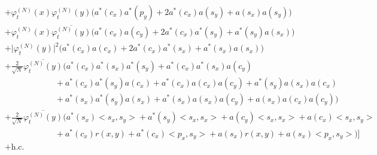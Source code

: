 \documentclass[11pt,a4paper]{scrartcl}
\newcommand{\hc}{\mbox{h.c.}}		%
\newcommand{\scal}[2]{\big<#1,#2\big>} %
\newcommand{\cc}[1]{\overline{#1}}	%
\newcommand{\ph}{\varphi_t^{(N)}}	%
\begin{document}
\begin{align}
& + \ph(x)\ph(y) \Big( a^*(c_x) a^*(p_y) + 2 a^*(c_x) a(s_y) +a(s_x) a(s_y) \Big) \label{l18}\\
& + \ph(x) \cc{\ph(y)} \Big( a^*(c_x) a(c_y) + 2 a^*(c_x) a^*(s_y) + a^*(s_y) a(s_x) \Big) \label{l19}\\
& + \lvert \ph(y) \rvert^2 \Big( a^*(c_x) a(c_x) + 2 a^*(c_x) a^*(s_x) + a^*(s_x) a(s_x) \Big) \label{l20}\\
& + \frac{2}{\sqrt{N}}\cc{\ph(y)} \bigg(    a^*(c_x) a^*(s_x) a^*(s_y) + a^*(c_x) a^*(s_x) a(c_y) \label{l21}\\
					    & \qquad\qquad\qquad + a^*(c_x) a^*(s_y) a(c_x) + a^*(c_x) a(c_x) a(c_y) + a^*(s_y) a(s_x) a(c_x) \label{l22}\\
					    & \qquad\qquad\qquad + a^*(s_x) a^*(s_y) a(s_x) + a^*(s_x) a(s_x) a(c_y) + a(s_x) a(c_x) a(c_y)  \bigg) \label{l23}\\
& + \frac{2}{\sqrt{N}}\cc{\ph(y)} \bigg(    a^*(s_x) \scal{s_x}{s_y} + a^*(s_y) \scal{s_x}{s_x}  + a(c_y) \scal{s_x}{s_x} + 							a(c_x) \scal{s_x}{s_y} \label{l24}\\
					    & \qquad\qquad\qquad + a^*(c_x)r(x,y) + a^*(c_x)\scal{p_x}{s_y} + a(s_x)r(x,y) + 			a(s_x)\scal{p_x}{s_y}		\bigg)    \Big] \label{l25}\\
&+ \hc
\end{align}
\end{document}
